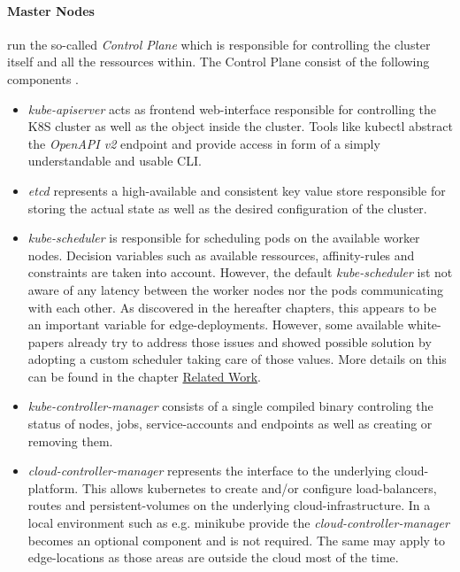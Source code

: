 \documentclass[MSC,Master,english]{twbook}%
\begin{document}
\paragraph{Master Nodes} run the so-called \textit{Control Plane} which is responsible for controlling the cluster itself and all the ressources within. The Control Plane consist of the following components \cite{k8scomp}.
\begin{itemize}
    \item \textit{kube-apiserver} acts as frontend web-interface responsible for controlling the \ac{K8S} cluster as well as the object inside the cluster. Tools like kubectl abstract the \textit{OpenAPI v2} endpoint and provide access in form of a simply understandable and usable \ac{CLI}. 
    \item \textit{etcd} represents a high-available and consistent key value store responsible for storing the actual state as well as the desired configuration of the cluster.
    \item \textit{kube-scheduler} is responsible for scheduling pods on the available worker nodes. Decision variables such as available ressources, affinity-rules and constraints are taken into account. However, the default \textit{kube-scheduler} ist not aware of any latency between the worker nodes nor the pods communicating with each other. As discovered in the hereafter chapters, this appears to be an important variable for edge-deployments. However, some available white-papers already try to address those issues and showed possible solution by adopting a custom scheduler taking care of those values. More details on this can be found in the chapter \hyperref[chap:related]{Related Work}.
    \item \textit{kube-controller-manager} consists of a single compiled binary controling the status of nodes, jobs, service-accounts and endpoints as well as creating or removing them.
    \item \textit{cloud-controller-manager} represents the interface to the underlying cloud-platform. This allows kubernetes to create and/or configure load-balancers, routes and persistent-volumes on the underlying cloud-infrastructure. In a local environment such as e.g. minikube provide the \textit{cloud-controller-manager} becomes an optional component and is not required. The same may apply to edge-locations as those areas are outside the cloud most of the time.
\end{itemize}
\end{document}
